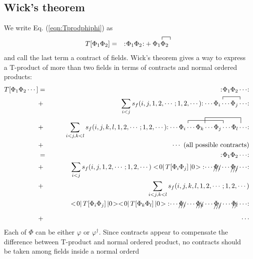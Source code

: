 \subsection{Wick's theorem}
We write Eq. (\ref{eqn:Tprodphiphi}) as
\begin{eqnarray}
T[\Phi_1 \Phi_2] &=&
\normalprod{\Phi_1 \Phi_2}
+
\acontraction[1ex]{}{\Phi}{{}_1}{\Phi}
\Phi_1 \Phi_2
\end{eqnarray}
and call the last term a contract of fields.
Wick's theorem gives a way to express a T-product of more than two
fields in terms of contracts and normal ordered products:
\begin{eqnarray}
T[\Phi_1 \Phi_2 \cdots ]
&=&
\normalprod{\Phi_1 \Phi_2 \cdots }
\nonumber\\
&+&
\sum_{i < j}  s_f(i,j,1,2,\cdots; 1, 2, \cdots)
\normalprod{
\acontraction[1ex]{\cdots}{\Phi}{{}_i\cdots}{\Phi}
\cdots \Phi_i \cdots \Phi_j \cdots
}%
\nonumber\\
&+&
\sum_{i < j, k<l}  s_f(i,j, k, l, 1,2,\cdots; 1, 2, \cdots)
\normalprod{
\acontraction[1ex]{\cdots}{\Phi}{{}_i\cdots \Phi_k \cdots}{\Phi}
\acontraction[2ex]{\cdots \Phi_i \cdots }{\Phi}{{}_k\cdots \Phi_j \cdots}{\Phi}
\cdots \Phi_i \cdots \Phi_k \cdots  \Phi_j \cdots \Phi_l \cdots
}%
\nonumber\\
&+&
\cdots  \mbox{ (all possible contracts)}
\nonumber\\
&=&
\normalprod{\Phi_1 \Phi_2 \cdots }
\nonumber\\
&+&
\sum_{i < j}  s_f(i,j,1,2,\cdots; 1, 2, \cdots)
\bra 0 \braend T[\Phi_i \Phi_j] \ketend 0 \ket
\normalprod{
\cdots \xout{\Phi_i} \cdots \xout{\Phi_j} \cdots
}%
\nonumber\\
&+&
\sum_{i < j, k<l}  s_f(i,j, k, l, 1,2,\cdots; 1, 2, \cdots)
\nonumber\\
&&
\hspace{10mm}
\bra 0 \braend T[\Phi_i \Phi_j] \ketend 0 \ket
\bra 0 \braend T[\Phi_k \Phi_l] \ketend 0 \ket
\normalprod{
\cdots \xout{\Phi_i} \cdots \xout{\Phi_k} \cdots  \xout{\Phi_j} \cdots \xout{\Phi_l} \cdots
}%
\nonumber\\
&+&
\cdots
\nonumber\\
\end{eqnarray}
Each of $\Phi$ can be either $\varphi$ or $\varphi^\dagger$.
Since contracts appear to compensate the difference between T-product and
normal ordered product, no contracts should be taken among fields inside a normal orderd
